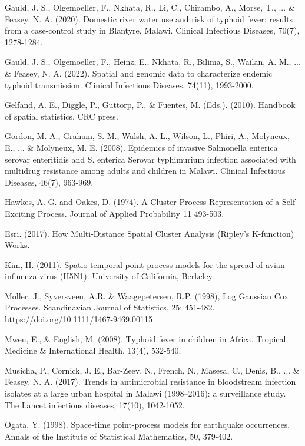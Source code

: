 \documentclass[12pt,a4paper]{report}
\begin{document}
\begin{thebibliography}{99}
	 Gauld, J. S., Olgemoeller, F., Nkhata, R., Li, C., Chirambo, A., Morse, T., ... \& Feasey, N. A. (2020). Domestic river water use and risk of typhoid fever: results from a case-control study in Blantyre, Malawi. Clinical Infectious Diseases, 70(7), 1278-1284.
	
	 Gauld, J. S., Olgemoeller, F., Heinz, E., Nkhata, R., Bilima, S., Wailan, A. M., ... \& Feasey, N. A. (2022). Spatial and genomic data to characterize endemic typhoid transmission. Clinical Infectious Diseases, 74(11), 1993-2000.
	
	 Gelfand, A. E., Diggle, P., Guttorp, P., \& Fuentes, M. (Eds.). (2010). Handbook of spatial statistics. CRC press.
	
	 Gordon, M. A., Graham, S. M., Walsh, A. L., Wilson, L., Phiri, A., Molyneux, E., ... \& Molyneux, M. E. (2008). Epidemics of invasive Salmonella enterica serovar enteritidis and S. enterica Serovar typhimurium infection associated with multidrug resistance among adults and children in Malawi. Clinical Infectious Diseases, 46(7), 963-969.
	
	 Hawkes, A. G. and Oakes, D. (1974). A Cluster Process Representation of a Self-Exciting Process. Journal of Applied Probability 11 493-503.
	
	 Esri. (2017). How Multi-Distance Spatial Cluster Analysis (Ripley’s K-function) Works.
	
	 Kim, H. (2011). Spatio-temporal point process models for the spread of avian influenza virus (H5N1). University of California, Berkeley.
	
	 Moller, J., Syversveen, A.R. \& Waagepetersen, R.P. (1998), Log Gaussian Cox Processes. Scandinavian Journal of Statistics, 25: 451-482. https://doi.org/10.1111/1467-9469.00115
	
	 Mweu, E., \& English, M. (2008). Typhoid fever in children in Africa. Tropical Medicine \& International Health, 13(4), 532-540.
	
	 Musicha, P., Cornick, J. E., Bar-Zeev, N., French, N., Masesa, C., Denis, B., ... \& Feasey, N. A. (2017). Trends in antimicrobial resistance in bloodstream infection isolates at a large urban hospital in Malawi (1998–2016): a surveillance study. The Lancet infectious diseases, 17(10), 1042-1052.
	
	 Ogata, Y. (1998). Space-time point-process models for earthquake occurrences. Annals of the Institute of Statistical Mathematics, 50, 379-402.
	

\end{thebibliography}
\end{document}
